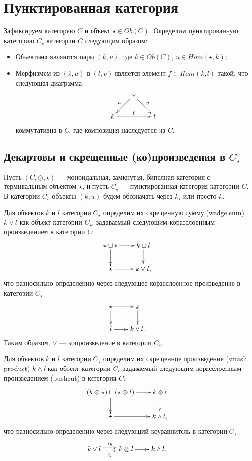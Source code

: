 \documentclass[a4paper,12pt]{article}
\begin{document}
\tableofcontents

\section{Пунктированная категория}

Зафиксируем категорию $C$ и объект $\star \in Ob(C)$. Определим пунктированную категорию $C_\star$ категории $C$ следующим образом:
\begin{itemize}
    \item Объектами являются пары $(k,u)$, где $k \in Ob(C)$, $u \in Hom(\star,k)$;
    \item Морфизмом из $(k,u)$ в $(l,v)$ является элемент $f \in Hom(k,l)$ такой, что следующая диаграмма
    $$\xymatrix@R=2em@C=2em{
        &\star \ar[ld]_u \ar[rd]^v&\\
        k \ar[rr]^f && l
    }$$
    коммутативна в $C$, где композиция наследуется из $C$.
\end{itemize}

\subsection{Декартовы и скрещенные (ко)произведения в $C_\star$}

Пусть $(C,\otimes,\star)$ --- моноидальная, замкнутая, биполная категория с терминальным объектом $\star$, и пусть $C_\star$ --- пунктированная категория категории $C$. В категории $C_\star$ объекты $(k,u)$ будем обозначать через $k_\star$ или просто $k$. 

Для объектов $k$ и $l$ категории $C_\star$ определим их скрещенную сумму (wedge sum) $k \vee l$ как объект категории $C_\star$, задаваемый следующим корасслоенным произведением в категории $C$:
$$\xymatrix@R=2em@C=2em{
    \star \sqcup \star \ar[r] \ar[d] & k \sqcup l \ar[d]\\
    \star \ar[r] & k \vee l,
}$$
что равносильно определению через следующее корасслоенное произведение в категории $C_\star$
$$\xymatrix@R=2em@C=2em{
    \star \ar[r] \ar[d] & k \ar[d]\\
    l \ar[r] & k \vee l.
}$$
Таким образом, $\vee$ --- копроизведение в категории $C_\star$.

Для объектов $k$ и $l$ категории $C_\star$ определим их скрещенное произведение (smash product) $k \wedge l$ как объект категории $C_\star$ задаваемый следующим корасслоенным произведением (pushout) в категории $C$:
$$\xymatrix@R=2em@C=2em{
    (k \otimes \star) \sqcup (\star \otimes l) \ar[r] \ar[d] & k \otimes l \ar[d]\\
    \star \ar[r] & k \wedge l,
}$$
что равносильно определению через следующий коуравнитель в категории $C_\star$
$$\xymatrix@R=2em@C=2em{
    k \vee l \ar@<0.5ex>[r]^-{i_k} \ar@<-0.5ex>[r]_-{i_l} & k \otimes l \ar[r] & k \wedge l.
}$$
\end{document}
